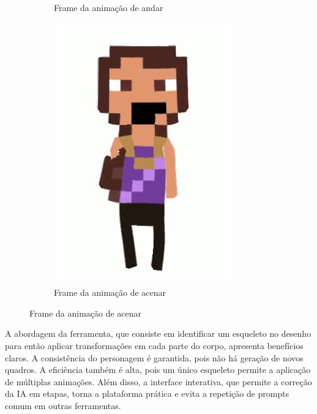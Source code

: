 \begin{figure}[htbp]
\begin{subfigure}{0.2\linewidth}
        \caption{\small Frame da animação de andar}
        \label{fig:sketchIrma3Frame1}
    \end{subfigure}
    \begin{subfigure}{0.2\linewidth}
        \includegraphics[width=1\linewidth]{figs/sketchLab/cabelo.PNG}
        \caption{\small Frame da animação de acenar}
        \label{fig:sketchIrma3Frame2}
    \end{subfigure}

\end{figure}

A abordagem da ferramenta, que consiste em identificar um esqueleto no desenho para então aplicar transformações em cada parte do corpo, apresenta benefícios claros. A consistência do personagem é garantida, pois não há geração de novos quadros. A eficiência também é alta, pois um único esqueleto permite a aplicação de múltiplas animações. Além disso, a interface interativa, que permite a correção da IA em etapas, torna a plataforma prática e evita a repetição de prompts comum em outras ferramentas.

